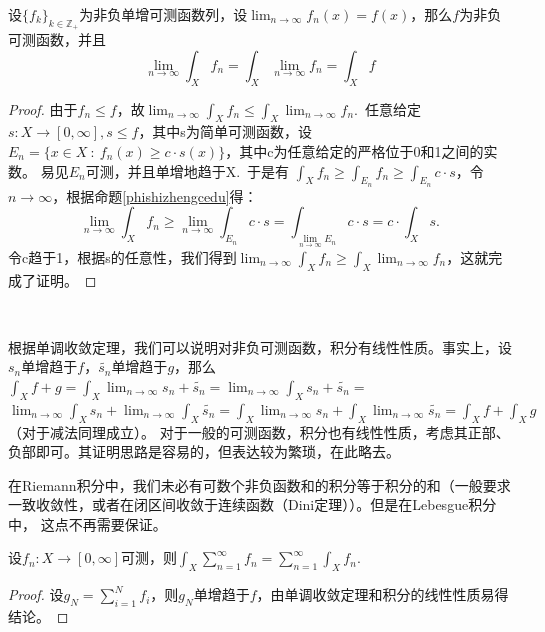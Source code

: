 \documentclass[color=green,thmcnt=section,lang=cn,12pt]{elegantbook}
\numberwithin{equation}{section}%
\numberwithin{figure}{section}%
\newcommand{\ZZ}{\mathbb{Z}}
\newcommand{\csf}[1]{\{#1_k\}_{k\in \ZZ_+}} %
\newcommand{\cs}[1]{\sum_{#1=1}^{\infty}} %
\newcommand{\ff}[1]{#1:X\to [0,\infty]} %
\begin{document}
\begin{proposition}\label{dandiaoshouliandingli}
    设$\csf{f}$为非负单增可测函数列，设$\lim_{n\to \infty}f_n(x)=f(x)$，那么$f$为非负可测函数，并且
    \begin{equation*}
        \lim_{n\to \infty}\int_{X}f_n=\int_{X}\lim_{n\to \infty}f_n=\int_{X}f
    \end{equation*}
\end{proposition}
\begin{proof}
    由于$f_n\leq f$，故$\lim_{n\to \infty}\int_{X}f_n\leq \int_{X}\lim_{n\to \infty}f_n$.\ 
    任意给定$s:X\to [0,\infty],s\leq f$，其中s为简单可测函数，设$E_n=\{x\in X\ :\ f_n(x)\geq c\cdot s(x)\}$，其中c为任意给定的严格位于0和1之间的实数。
    易见$E_n$可测，并且单增地趋于X.\ 于是有
    $\int_{X}f_n\geq \int_{E_n}f_n\geq \int_{E_n}c\cdot s$，令$n\to \infty$，根据命题\ref{phishizhengcedu}得：
    \begin{equation*}
        \lim_{n\to \infty}\int_{X}f_n\geq \lim_{n\to \infty}\int_{E_n}c\cdot s=\int_{\lim_{n\to \infty} E_n}c\cdot s=c\cdot \int_{X}s.
    \end{equation*}
    令c趋于1，根据s的任意性，我们得到$\lim_{n\to \infty}\int_{X}f_n\geq \int_{X}\lim_{n\to \infty}f_n$，这就完成了证明。
\end{proof}
\ 


根据单调收敛定理，我们可以说明对非负可测函数，积分有线性性质。事实上，设$s_n$单增趋于$f$，$\widetilde{s_n}$单增趋于$g$，那么
$\int_{X}f+g=\int_{X}\lim_{n\to \infty}s_n+\widetilde{s_n}=\lim_{n\to \infty}\int_{X}s_n+\widetilde{s_n}=$
$\lim_{n\to \infty}\int_{X}s_n+\lim_{n\to \infty}\int_{X}\widetilde{s_n}=\int_{X}\lim_{n\to \infty}s_n+\int_{X}\lim_{n\to \infty}\widetilde{s_n}=\int_Xf+\int_Xg$
（对于减法同理成立）。
对于一般的可测函数，积分也有线性性质，考虑其正部、负部即可。其证明思路是容易的，但表达较为繁琐，在此略去。


在Riemann积分中，我们未必有可数个非负函数和的积分等于积分的和（一般要求一致收敛性，或者在闭区间收敛于连续函数（Dini定理））。但是在Lebesgue积分中，
这点不再需要保证。
\begin{proposition}\label{jifendehedengyuhedejifen}
    设$\ff{f_n}$可测，则$\int_X \cs{n}f_n=\cs{n}\int_{X}f_n$.\ 
\end{proposition}
\begin{proof}
    设$g_N=\sum_{i=1}^{N}f_i$，则$g_N$单增趋于$f$，由单调收敛定理和积分的线性性质易得结论。
\end{proof}
\ 
\end{document}
